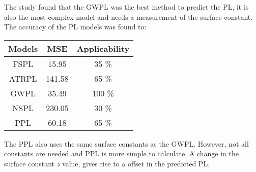 \large



The study found that the GWPL was the best method to predict the PL, it is also the most complex model and needs a measurement of the surface constant. The accuracy of the PL models was found to:

\begin{center}
\begin{tabular}{|c|c|c|}
\hline
\rowcolor{white}
\textbf{Models} & \textbf{MSE} & \textbf{Applicability} \\ \hline \rowcolor{white}
FSPL            & 15.95        & 35 \%                  \\ \hline \rowcolor{white}
ATRPL 		    & 141.58       & 65 \%                  \\ \hline \rowcolor{white} %
GWPL            & 35.49        & 100 \%                 \\ \hline \rowcolor{white}
NSPL            & 230.05       & 30 \%                  \\ \hline \rowcolor{white}
PPL            & 60.18        & 65 \%                  \\ \hline
\end{tabular}
\end{center}


The PPL also uses the same surface constants as the GWPL. However, not all constants are needed and PPL is more simple to calculate. A change in the surface constant \textit{z} value, gives rise to a offset in the predicted PL.

